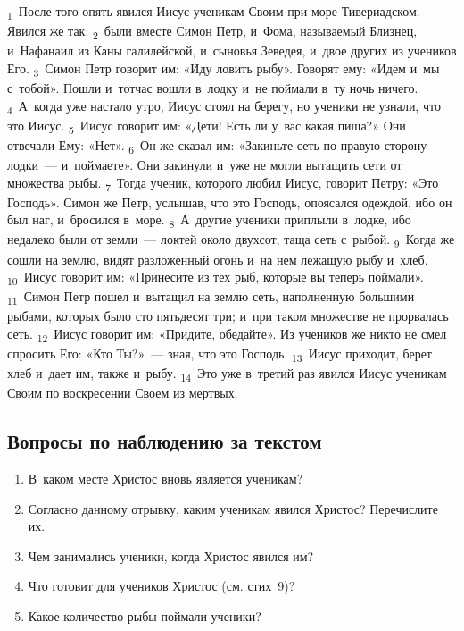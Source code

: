 \documentclass[a4paper,12pt]{article}
\begin{document}
\textsubscript{1}~После того опять явился Иисус ученикам Своим при море Тивериадском. Явился же так: \textsubscript{2}~были вместе Симон Петр, и~Фома, называемый Близнец, и~Нафанаил из Каны галилейской, и~сыновья Зеведея, и~двое других из учеников Его. \textsubscript{3}~Симон Петр говорит им: «Иду ловить рыбу». Говорят ему: «Идем и~мы с~тобой». Пошли и~тотчас вошли в~лодку и~не поймали в~ту ночь ничего. \textsubscript{4}~А~когда уже настало утро, Иисус стоял на берегу, но ученики не узнали, что это Иисус. \textsubscript{5}~Иисус говорит им: «Дети! Есть ли у~вас какая пища?» Они отвечали Ему: «Нет». \textsubscript{6}~Он же сказал им: «Закиньте сеть по правую сторону лодки~--- и~поймаете». Они закинули и~уже не могли вытащить сети от множества рыбы. \textsubscript{7}~Тогда ученик, которого любил Иисус, говорит Петру: «Это Господь». Симон же Петр, услышав, что это Господь, опоясался одеждой, ибо он был наг, и~бросился в~море. \textsubscript{8}~А~другие ученики приплыли в~лодке, ибо недалеко были от земли~--- локтей около двухсот, таща сеть с~рыбой. \textsubscript{9}~Когда же сошли на землю, видят разложенный огонь и~на нем лежащую рыбу и~хлеб. \textsubscript{10}~Иисус говорит им: «Принесите из тех рыб, которые вы теперь поймали». \textsubscript{11}~Симон Петр пошел и~вытащил на землю сеть, наполненную большими рыбами, которых было сто пятьдесят три; и~при таком множестве не прорвалась сеть. \textsubscript{12}~Иисус говорит им: «Придите, обедайте». Из учеников же никто не смел спросить Его: «Кто Ты?»~--- зная, что это Господь. \textsubscript{13}~Иисус приходит, берет хлеб и~дает им, также и~рыбу. \textsubscript{14}~Это уже в~третий раз явился Иисус ученикам Своим по воскресении Своем из мертвых. 

\subsection*{Вопросы по наблюдению за текстом}
\begin{enumerate}
    \item В~каком месте Христос вновь является ученикам? 
    
    \myline
    
    \myline
    \item Согласно данному отрывку, каким ученикам явился Христос? Перечислите их. 
    
    \myline
    
    \myline
    \item Чем занимались ученики, когда Христос явился им? 
    
    \myline
    
    \myline
    \item Что готовит для учеников Христос (см. стих~9)? 
    
    \myline
    
    \myline
    \item Какое количество рыбы поймали ученики? 
    
    \myline
    
    \myline
\end{enumerate}
\end{document}
